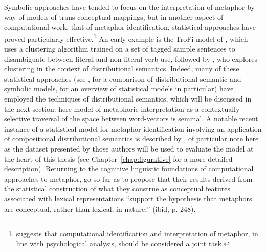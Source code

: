 Symbolic approaches have tended to focus on the interpretation of metaphor by way of models of trans-conceptual mappings, but in another aspect of computational work, that of metaphor identification, statistical approaches have proved particularly effective.\footnote{\cite{Shutova2013} suggests that computational identification and interpretation of metaphor, in line with psychological analysis, should be considered a joint task.}  An early example is the TroFi model of \cite{BirkeEA2006}, which uses a clustering algorithm trained on a set of tagged sample sentences to disambiguate between literal and non-literal verb use, followed by \cite{Utsumi2011}, who explores clustering in the context of distributional semantics.  Indeed, many of these statistical approaches (see \citealt{TurneyEA2011}, \citealt{Dunn2013} for a comparison of distributional semantic and symbolic models, \citealt{ShutovaEA2013} for an overview of statistical models in particular) have employed the techniques of distributional semantics, which will be discussed in the next section: here  model of metaphoric interpretation as a contextually selective traversal of the space between word-vectors is seminal.  A notable recent instance of a statistical model for metaphor identification involving an application of compositional distributional semantics is described by \cite{GutierrezEA2016}, of particular note here as the dataset presented by those authors will be used to evaluate the model at the heart of this thesis (see Chapter~\ref{chap:figurative} for a more detailed description).  Returning to the cognitive linguistic foundations of computational approaches to metaphor, \cite{TsvetkovEA2014} go so far as to propose that their results derived from the statistical construction of what they construe as conceptual features associated with lexical representations ``support the hypothesis that metaphors are conceptual, rather than lexical, in nature,'' (ibid, p. 248).

